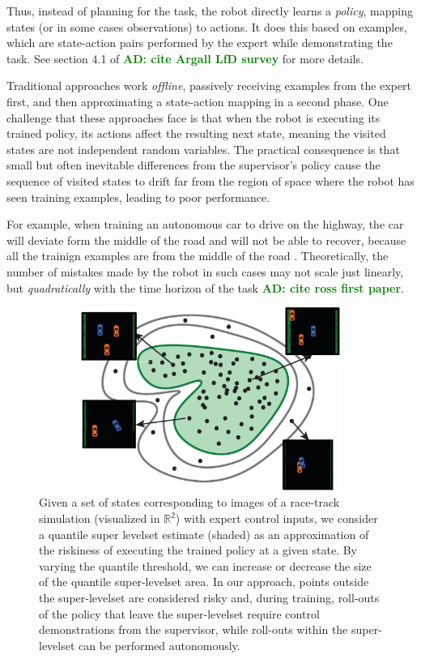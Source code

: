 \documentclass[10pt, conference]{ieeeconf}      %
\newcommand{\adnote}[1]{\ifthenelse{\boolean{include-notes}}%
 {\textcolor{green}{\textbf{AD: #1}}}{}}
\begin{document}
Thus, instead of planning for the task, the robot directly learns a \emph{policy}, mapping states (or in some cases observations) to actions. It does this based on examples, which are state-action pairs performed by the expert while demonstrating the task. See section 4.1 of \cite{} \adnote{cite Argall LfD survey} for more details.

Traditional approaches work \emph{offline}, passively receiving examples from the expert first, and then approximating a state-action mapping in a second phase. One challenge that these approaches face is that when the robot is executing its trained policy, its actions affect the resulting next state, meaning the visited states are not independent random variables. The practical consequence is that small but often inevitable differences from the supervisor's policy cause the sequence of visited states to drift far from the region of space where the robot has seen training examples, leading to poor performance. 

For example, when training an autonomous car to drive on the highway, the car will deviate form the middle of the road and will not be able to recover, because all the trainign examples are from the middle of the road \cite{pomerleau1989alvinn}. Theoretically, the number of mistakes made by the robot in such cases may not scale just linearly, but \emph{quadratically} with the time horizon of the task \cite{} \adnote{cite ross first paper}.

\begin{figure}[t!]
\centering
\includegraphics[width=12cm, height=6cm]{figures/teaser.eps}
\caption{ 
Given a set of states corresponding to images of a race-track simulation (visualized in $\mathbb{R}^2$) with expert
control inputs, we consider a quantile super levelset estimate (shaded) as an approximation of the riskiness of
executing the trained policy at a given state. By varying the quantile threshold, we can increase or decrease the size
of the quantile super-levelset area. In our approach, points outside the super-levelset are considered risky and, during
training, roll-outs of the policy that leave the super-levelset require control demonstrations from the supervisor,
while roll-outs within the super-levelset can be performed autonomously. 
}
\vspace*{-10pt}
\label{fig:dis_traveled}
\end{figure}
\end{document}
